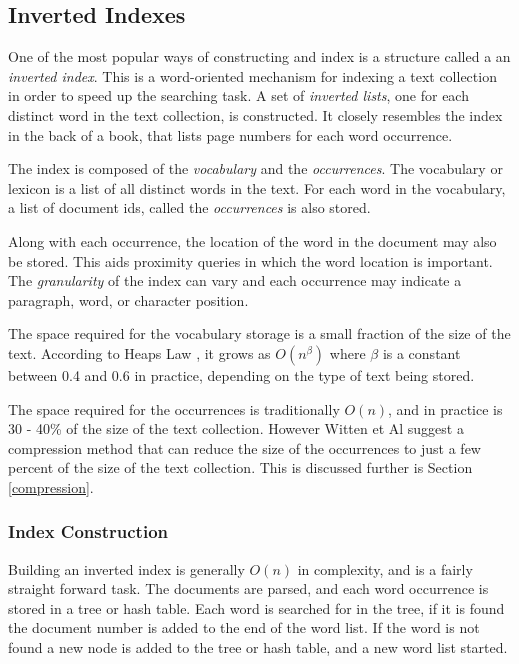 \subsection{Inverted Indexes}

One of the most popular ways of constructing and index is a structure
called a an \emph{inverted index}.  This is a word-oriented mechanism for
indexing a text collection in order to speed up the searching task. A set
of \emph{inverted lists}, one for each distinct word in the text
collection, is constructed.  It closely resembles the index in the back of
a book, that lists page numbers for each word occurrence.

The index is composed of the \emph{vocabulary} and the \emph{occurrences}.
The vocabulary or lexicon is a list of all distinct words in the text.  For each word
in the vocabulary, a list of document ids, called the \emph{occurrences} is
also stored.

Along with each occurrence, the location of the word in the document may
also be stored.  This aids proximity queries in which the word location is
important.  The \emph{granularity} of the index can vary and each
occurrence may indicate a paragraph, word, or character position.

The space required for the vocabulary storage is a small fraction of the
size of the text.  According to Heaps Law \cite{heaps78}, it grows as
$O(n^\beta)$ where $\beta$ is a constant between 0.4 and 0.6 in practice,
depending on the type of text being stored.

The space required for the occurrences is traditionally $O(n)$, and in
practice is 30 - 40\% of the size of the text collection.  However Witten
et Al \cite{wmb:mg} suggest a compression method that can reduce the size
of the occurrences to just a few percent of the size of the text
collection.  This is discussed further is Section \ref{compression}.

\subsubsection{Index Construction}
Building an inverted index is generally $O(n)$ in complexity, and is a
fairly straight forward task.  The documents are parsed, and each word
occurrence is stored in a tree or hash table.  Each word is searched for in
the tree, if it is found the document number is added to the end of the
word list.  If the word is not found a new node is added to the tree or
hash table, and a new word list started.

